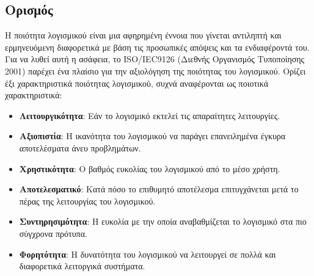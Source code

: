 \documentclass[a4paper, 11pt]{article}
\begin{document}
{{\subsection{Ορισμός}
Η ποιότητα λογισμικού είναι μια αφηρημένη έννοια που γίνεται αντιληπτή και ερμηνευόμενη διαφορετικά
με βάση τις προσωπικές απόψεις και τα ενδιαφέροντά του. Για να λυθεί αυτή η ασάφεια, το \textlatin{ISO/IEC9126} (Διεθνής Οργανισμός Τυποποίησης 2001) παρέχει ένα πλαίσιο για
την αξιολόγηση της ποιότητας του λογισμικού. Ορίζει έξι χαρακτηριστικά ποιότητας λογισμικού, συχνά
αναφέρονται ως ποιοτικά χαρακτηριστικά:
\begin{itemize}
\item \textbf{Λειτουργικότητα}: Εάν το λογισμικό εκτελεί τις απαραίτητες λειτουργίες.
\item \textbf{Αξιοπιστία}: Η ικανότητα του λογισμικού να παράγει επανειλημένα έγκυρα αποτελέσματα άνευ προβλημάτων.
\item \textbf{Χρηστικότητα}: Ο βαθμός ευκολίας του λογισμικού από το μέσο χρήστη.
\item \textbf{Αποτελεσματικό}: Κατά πόσο το επιθυμητό αποτέλεσμα επιτυγχάνεται μετά το πέρας της λειτουργίας του λογισμικού.
\item \textbf{Συντηρησιμότητα}: Η ευκολία με την οποία αναβαθμίζεται το λογισμικό στα πιο σύγχρονα πρότυπα.
\item \textbf{Φορητότητα}: Η δυνατότητα του λογισμικού να λειτουργεί σε πολλά και διαφορετικά λειτοργικά συστήματα.
\end{itemize}

}}
\end{document}
